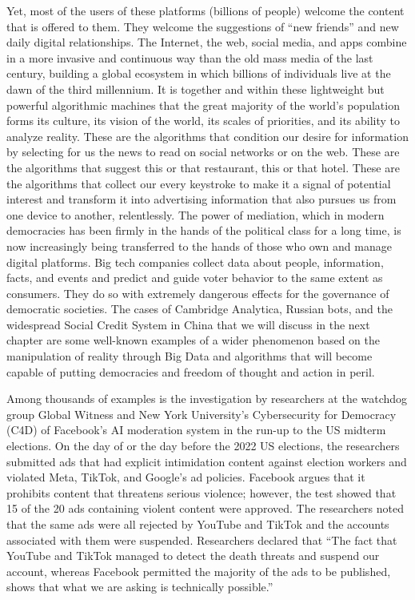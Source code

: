 Yet, most of the users of these platforms (billions of people) welcome the content that is offered to them. They welcome the suggestions of ``new friends'' and new daily digital relationships. The Internet, the web, social media, and apps combine in a more invasive and continuous way than the old mass media of the last century, building a global ecosystem in which billions of individuals live at the dawn of the third millennium. It is together and within these lightweight but powerful algorithmic machines that the great majority of the world's population forms its culture, its vision of the world, its scales of priorities, and its ability to analyze reality. These are the algorithms that condition our desire for information by selecting for us the news to read on social networks or on the web. These are the algorithms that suggest this or that restaurant, this or that hotel. These are the algorithms that collect our every keystroke to make it a signal of potential interest and transform it into advertising information that also pursues us from one device to another, relentlessly. The power of mediation, which in modern democracies has been firmly in the hands of the political class for a long time, is now increasingly being transferred to the hands of those who own and manage digital platforms. Big tech companies collect data about people, information, facts, and events and predict and guide voter behavior to the same extent as consumers. They do so with extremely dangerous effects for the governance of democratic societies. The cases of Cambridge Analytica, Russian bots, and the widespread Social Credit System in China that we will discuss in the next chapter are some well-known examples of a wider phenomenon based on the manipulation of reality through Big Data and algorithms that will become capable of putting democracies and freedom of thought and action in peril.

Among thousands of examples is the investigation by researchers at the watchdog group Global Witness and New York University's Cybersecurity for Democracy (C4D) of Facebook's AI moderation system in the run-up to the US midterm elections. On the day of or the day before the 2022 US elections, the researchers submitted ads that had explicit intimidation content against election workers and violated Meta, TikTok, and Google's ad policies. Facebook argues that it prohibits content that threatens serious violence; however, the test showed that 15 of the 20 ads containing violent content were approved. The researchers noted that the same ads were all rejected by YouTube and TikTok and the accounts associated with them were suspended. Researchers declared that ``The fact that YouTube and TikTok managed to detect the death threats and suspend our account, whereas Facebook permitted the majority of the ads to be published, shows that what we are asking is technically possible.''

